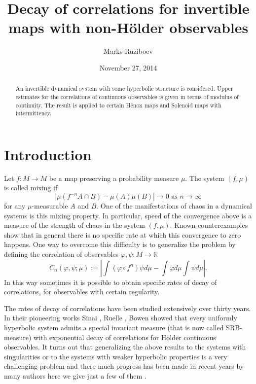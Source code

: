 \documentclass[a4paper,12pt]{amsart}
\author[Marks Ruziboev]{Marks Ruziboev }
\title[Decay of correlations non-H\"older observables]
{Decay of correlations for invertible maps with
non-H\"older observables}
\date{November 27, 2014}
\numberwithin{equation}{section}
\begin{document}
\begin{abstract}
An invertible dynamical system with some hyperbolic structure is
considered. Upper estimates for the correlations of continuous
observables is given in terms of  modulus of continuity. The result
is applied to  certain H\'enon maps and Solenoid maps with
intermittency.
\end{abstract}

\maketitle

\section{Introduction}
Let $f:M\to M$ be a map preserving a probability measure $\mu.$ The
system $(f, \mu)$ is called mixing if
$$ |\mu(f^{-n}A\cap
B)-\mu(A)\mu(B)|\to 0\,\,\text{as}\,\, n\to \infty $$ for any
$\mu$-measurable $A$ and $B.$ One of the manifestations of chaos in
a dynamical systems is this mixing property.  In particular, speed
of the convergence above is a measure of the strength of chaos in
the system $(f, \mu).$ Known counterexamples show that in general
there is no specific rate at which this convergence to zero happens.
One way to overcome this difficulty is to generalize the problem by
defining the correlation of observables $\varphi,\psi:M\to \mathbb
R$
$$C_n(\varphi, \psi; \mu):=
\left|\int(\varphi\circ f^n)\psi d\mu-\int\varphi d\mu\int\psi
d\mu\right|.$$ In this way sometimes it is possible to obtain
specific rates of decay of correlations, for observables with
certain regularity.

The rates of decay of correlations have been studied extensively
over thirty years. In their pioneering works Sinai \cite{S1}, Ruelle
\cite{R}, Bowen \cite{B} showed that every uniformly hyperbolic
system admits a special invariant measure (that is now called
SRB-measure) with exponential decay of correlations for H\"older
continuous observables. It turns out that generalizing the above
results to the systems with singularities or to the systems with
weaker hyperbolic properties is a very challenging problem and there
much progress has been made in recent years by  many authors here we
give just a few of them \cite{AlvPin, BY2, BLS, Chern, ChM, DHL,
Dol, Gou, LY, Li1, Li2, Y1, Y2}.
\end{document}
